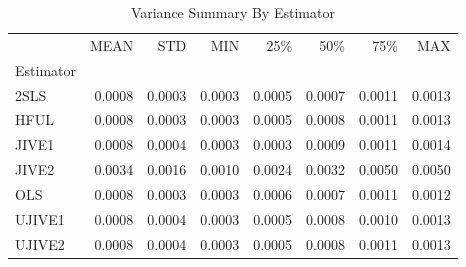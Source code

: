 \begin{table}[ht]
\centering
\caption{Variance Summary By Estimator}
\begin{tabular}{lrrrrrrr}
\toprule
 & MEAN & STD & MIN & 25\% & 50\% & 75\% & MAX \\
Estimator &  &  &  &  &  &  &  \\
\midrule
2SLS & 0.0008 & 0.0003 & 0.0003 & 0.0005 & 0.0007 & 0.0011 & 0.0013 \\
HFUL & 0.0008 & 0.0003 & 0.0003 & 0.0005 & 0.0008 & 0.0011 & 0.0013 \\
JIVE1 & 0.0008 & 0.0004 & 0.0003 & 0.0003 & 0.0009 & 0.0011 & 0.0014 \\
JIVE2 & 0.0034 & 0.0016 & 0.0010 & 0.0024 & 0.0032 & 0.0050 & 0.0050 \\
OLS & 0.0008 & 0.0003 & 0.0003 & 0.0006 & 0.0007 & 0.0011 & 0.0012 \\
UJIVE1 & 0.0008 & 0.0004 & 0.0003 & 0.0005 & 0.0008 & 0.0010 & 0.0013 \\
UJIVE2 & 0.0008 & 0.0004 & 0.0003 & 0.0005 & 0.0008 & 0.0011 & 0.0013 \\
\bottomrule
\end{tabular}
\end{table}
